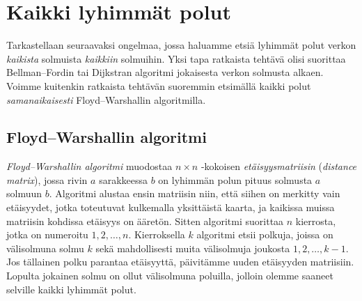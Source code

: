 \section{Kaikki lyhimmät polut}

Tarkastellaan seuraavaksi ongelmaa, jossa
haluamme etsiä lyhimmät polut verkon
\emph{kaikista} solmuista \emph{kaikkiin} solmuihin.
Yksi tapa ratkaista tehtävä olisi suorittaa Bellman–Fordin
tai Dijkstran algoritmi jokaisesta verkon solmusta alkaen.
Voimme kuitenkin ratkaista tehtävän suoremmin
etsimällä kaikki polut \emph{samanaikaisesti}
Floyd–Warshallin algoritmilla.

\subsection{Floyd–Warshallin algoritmi}


\emph{Floyd–Warshallin algoritmi} muodostaa $n \times n$ -kokoisen
\emph{etäisyysmatriisin} (\emph{distance matrix}),
jossa rivin $a$ sarakkeessa $b$ on lyhimmän polun pituus
solmusta $a$ solmuun $b$.
Algoritmi alustaa ensin matriisin niin,
että siihen on merkitty vain etäisyydet,
jotka toteutuvat kulkemalla yksittäistä kaarta,
ja kaikissa muissa matriisin kohdissa etäisyys on ääretön.
Sitten algoritmi suorittaa $n$ kierrosta,
jotka on numeroitu $1,2,\dots,n$.
Kierroksella $k$ algoritmi etsii polkuja, joissa on välisolmuna
solmu $k$ sekä mahdollisesti muita välisolmuja joukosta $1,2,\dots,k-1$.
Jos tällainen polku parantaa etäisyyttä,
päivitämme uuden etäisyyden matriisiin.
Lopulta jokainen solmu on ollut
välisolmuna poluilla, jolloin olemme saaneet selville
kaikki lyhimmät polut.

